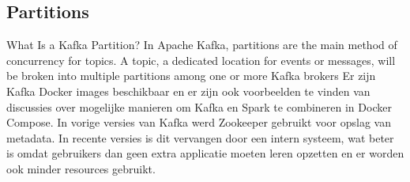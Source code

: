 \subsection{Partitions}
What Is a Kafka Partition? In Apache Kafka, partitions are the main method of concurrency for topics. A topic, a dedicated location for events or messages, will be broken into multiple partitions among one or more Kafka brokers\autocite{Carder2022}
\newline
\newline
Er zijn Kafka Docker images beschikbaar en er zijn ook voorbeelden te vinden van discussies over mogelijke manieren om Kafka en Spark te combineren in Docker Compose.
\newline
\newline
In vorige versies van Kafka werd Zookeeper gebruikt voor opslag van metadata. In recente versies is dit vervangen door een intern systeem, wat beter is omdat gebruikers dan geen extra applicatie moeten leren opzetten en er worden ook minder resources gebruikt.

